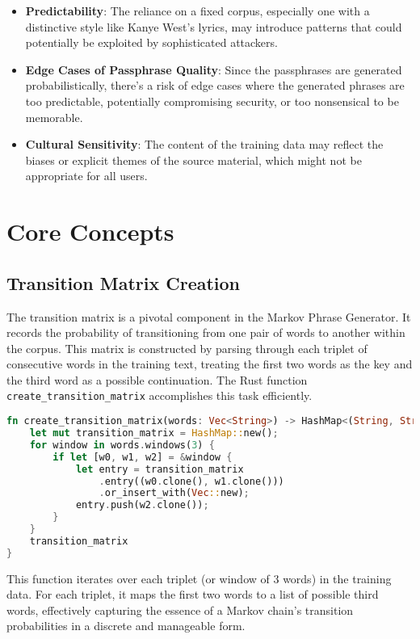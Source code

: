 \documentclass[a4paper,12pt]{article}
\begin{document}
\begin{itemize}
  \item \textbf{Predictability}: The reliance on a fixed corpus, especially one with a distinctive style like Kanye West's lyrics, may introduce patterns that could potentially be exploited by sophisticated attackers.
  \item \textbf{Edge Cases of Passphrase Quality}: Since the passphrases are generated probabilistically, there's a risk of edge cases where the generated phrases are too predictable, potentially compromising security, or too nonsensical to be memorable.
  \item \textbf{Cultural Sensitivity}: The content of the training data may reflect the biases or explicit themes of the source material, which might not be appropriate for all users.
\end{itemize}

\section{Core Concepts}
\subsection{Transition Matrix Creation}
The transition matrix is a pivotal component in the Markov Phrase Generator. It records the probability of transitioning from one pair of words to another within the corpus. This matrix is constructed by parsing through each triplet of consecutive words in the training text, treating the first two words as the key and the third word as a possible continuation. The Rust function \texttt{create\_transition\_matrix} accomplishes this task efficiently.

\begin{lstlisting}[language=Rust, caption={Creating the Transition Matrix}]
fn create_transition_matrix(words: Vec<String>) -> HashMap<(String, String), Vec<String>> {
    let mut transition_matrix = HashMap::new();
    for window in words.windows(3) {
        if let [w0, w1, w2] = &window {
            let entry = transition_matrix
                .entry((w0.clone(), w1.clone()))
                .or_insert_with(Vec::new);
            entry.push(w2.clone());
        }
    }
    transition_matrix
}
\end{lstlisting}

This function iterates over each triplet (or window of 3 words) in the training data. For each triplet, it maps the first two words to a list of possible third words, effectively capturing the essence of a Markov chain's transition probabilities in a discrete and manageable form.
\end{document}
